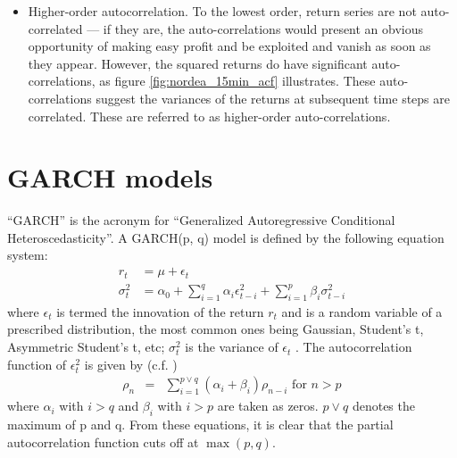 \documentclass{report}
\begin{document}
\begin{itemize}
\item Higher-order autocorrelation. To the lowest order, return series
  are not auto-correlated --- if they are, the auto-correlations would
  present an obvious opportunity of making easy profit and be
  exploited and vanish as soon as they appear. However, the squared
  returns do have significant auto-correlations, as figure
  \ref{fig:nordea_15min_acf} illustrates. These auto-correlations
  suggest the variances of the returns at subsequent time steps are
  correlated. These are referred to as higher-order
  auto-correlations.
\end{itemize}

\section{GARCH models}
``GARCH'' is the acronym for ``Generalized Autoregressive Conditional
Heteroscedasticity''. A GARCH(p, q) model is defined by the following
equation system:
\begin{equation}
  \label{eq:garch_def}
  \begin{aligned}
    r_t &= \mu + \epsilon_t \\
    \sigma_t^2 &= \alpha_0 + \sum_{i=1}^q \alpha_i \epsilon_{t-i}^2 +
    \sum_{i=1}^p \beta_i \sigma_{t-i}^2
  \end{aligned}
\end{equation}
where $\epsilon_t$ is termed the innovation of the return $r_t$ and is
a random variable of a prescribed distribution, the most common ones
being Gaussian, Student's t, Asymmetric Student's t, etc; $\sigma_t^2$
is the variance of $\epsilon_t$ \cite{Bollerslev86}. The
autocorrelation function of $\epsilon_t^2$ is given by
(c.f. \cite{Bollerslev87})
\begin{eqnarray*}
\rho_n &=& \sum_{i=1} ^{p \vee q} (\alpha_i + \beta_i) \rho_{n-i}
\text{ for $n > p$}
\end{eqnarray*}
where $\alpha_i$ with $i > q$ and $\beta_i$ with $i > p$ are taken as
zeros. $p \vee q$ denotes the maximum of p and q. From these
equations, it is clear that the partial autocorrelation function cuts
off at $\max(p, q)$.
\end{document}
